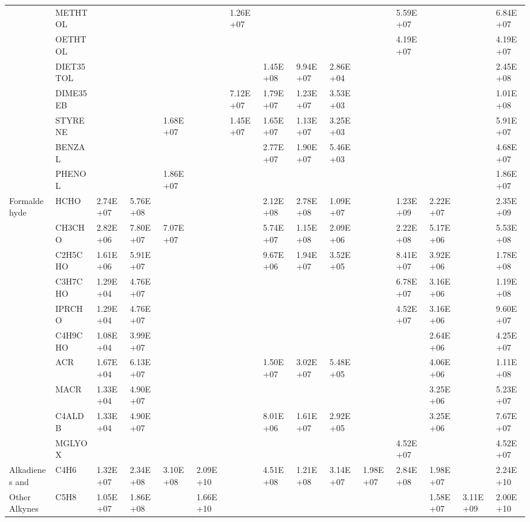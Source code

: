 \begin{longtable}{lllllllllllllll}
	 & METHTOL &  &  &  &  & 1.26E+07 &  &  &  &  & 5.59E+07 &  &  & 6.84E+07 \\
	 & OETHTOL &  &  &  &  &  &  &  &  &  & 4.19E+07 &  &  & 4.19E+07 \\
	 & DIET35TOL &  &  &  &  &  & 1.45E+08 & 9.94E+07 & 2.86E+04 &  &  &  &  & 2.45E+08 \\
	 & DIME35EB &  &  &  &  & 7.12E+07 & 1.79E+07 & 1.23E+07 & 3.53E+03 &  &  &  &  & 1.01E+08 \\
	 & STYRENE &  &  & 1.68E+07 &  & 1.45E+07 & 1.65E+07 & 1.13E+07 & 3.25E+03 &  &  &  &  & 5.91E+07 \\
	 & BENZAL &  &  &  &  &  & 2.77E+07 & 1.90E+07 & 5.46E+03 &  &  &  &  & 4.68E+07 \\
	 & PHENOL &  &  & 1.86E+07 &  &  &  &  &  &  &  &  &  & 1.86E+07 \\
	\hline Formaldehyde & HCHO & 2.74E+07 & 5.76E+08 &  &  &  & 2.12E+08 & 2.78E+08 & 1.09E+07 &  & 1.23E+09 & 2.22E+07 &  & 2.35E+09 \\ \hline
	\parbox[t]{2mm}{} & CH3CHO & 2.82E+06 & 7.80E+07 & 7.07E+07 &  &  & 5.74E+07 & 1.15E+08 & 2.09E+06 &  & 2.22E+08 & 5.17E+06 &  & 5.53E+08 \\
	 & C2H5CHO & 1.61E+06 & 5.91E+07 &  &  &  & 9.67E+06 & 1.94E+07 & 3.52E+05 &  & 8.41E+07 & 3.92E+06 &  & 1.78E+08 \\
	 & C3H7CHO & 1.29E+04 & 4.76E+07 &  &  &  &  &  &  &  & 6.78E+07 & 3.16E+06 &  & 1.19E+08 \\
	 & IPRCHO & 1.29E+04 & 4.76E+07 &  &  &  &  &  &  &  & 4.52E+07 & 3.16E+06 &  & 9.60E+07 \\
	 & C4H9CHO & 1.08E+04 & 3.99E+07 &  &  &  &  &  &  &  &  & 2.64E+06 &  & 4.25E+07 \\
	 & ACR & 1.67E+04 & 6.13E+07 &  &  &  & 1.50E+07 & 3.02E+07 & 5.48E+05 &  &  & 4.06E+06 &  & 1.11E+08 \\
	 & MACR & 1.33E+04 & 4.90E+07 &  &  &  &  &  &  &  &  & 3.25E+06 &  & 5.23E+07 \\
	 & C4ALDB & 1.33E+04 & 4.90E+07 &  &  &  & 8.01E+06 & 1.61E+07 & 2.92E+05 &  &  & 3.25E+06 &  & 7.67E+07 \\
	 & MGLYOX &  &  &  &  &  &  &  &  &  & 4.52E+07 &  &  & 4.52E+07 \\
	\hline Alkadienes and & C4H6 & 1.32E+07 & 2.34E+08 & 3.10E+08 & 2.09E+10 &  & 4.51E+08 & 1.21E+08 & 3.14E+07 & 1.98E+07 & 2.84E+08 & 1.98E+07 &  & 2.24E+10 \\
	Other Alkynes & C5H8 & 1.05E+07 & 1.86E+08 &  & 1.66E+10 &  &  &  &  &  &  & 1.58E+07 & 3.11E+09 & 2.00E+10 \\

\end{longtable}
